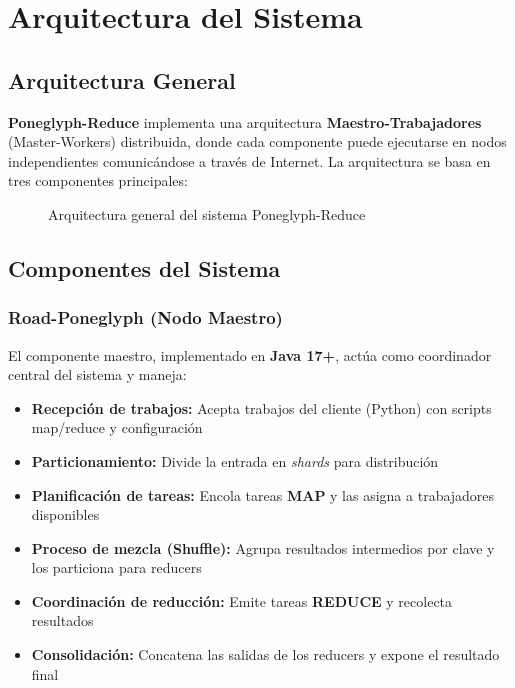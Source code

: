 \section{Arquitectura del Sistema}

\subsection{Arquitectura General}

\textbf{Poneglyph-Reduce} implementa una arquitectura \textbf{Maestro-Trabajadores} (Master-Workers) distribuida, donde cada componente puede ejecutarse en nodos independientes comunicándose a través de Internet. La arquitectura se basa en tres componentes principales:

\begin{figure}[H]
  \centering
  \caption{Arquitectura general del sistema Poneglyph-Reduce}
  \label{fig:architecture}
\end{figure}

\subsection{Componentes del Sistema}

\subsubsection{Road-Poneglyph (Nodo Maestro)}

El componente maestro, implementado en \textbf{Java 17+}, actúa como coordinador central del sistema y maneja:

\begin{itemize}
    \item \textbf{Recepción de trabajos:} Acepta trabajos del cliente (Python) con scripts map/reduce y configuración
    \item \textbf{Particionamiento:} Divide la entrada en \emph{shards} para distribución
    \item \textbf{Planificación de tareas:} Encola tareas \textbf{MAP} y las asigna a trabajadores disponibles
    \item \textbf{Proceso de mezcla (Shuffle):} Agrupa resultados intermedios por clave y los particiona para reducers
    \item \textbf{Coordinación de reducción:} Emite tareas \textbf{REDUCE} y recolecta resultados
    \item \textbf{Consolidación:} Concatena las salidas de los reducers y expone el resultado final
\end{itemize}

